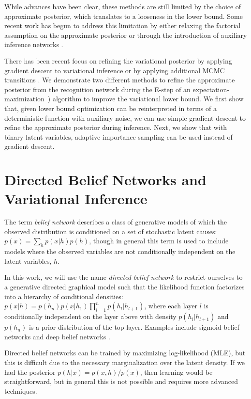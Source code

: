 \documentclass{article} %
\begin{document}
While advances have been clear, these methods are still limited by the choice
of approximate posterior, which translates to a looseness in the lower bound.
Some recent work has begun to address this limitation by either relaxing the
factorial assumption \citep{burda2015importance} on the approximate posterior or
through the introduction of auxiliary inference networks
\citep{rezende2015variational}.

There has been recent focus on
refining the variational posterior by applying gradient descent to variational
inference \citep{hoffman2013stochastic} or by applying additional MCMC
transitions \citep{salimans2014markov}. We demonstrate two different methods to
refine the approximate posterior from the recognition network during the E-step
of an expectation-maximization~\citep[EM,][]{dempster1977maximum, neal1998view})
algorithm to improve the variational lower bound. 
We first show that, given lower bound optimization can be
reinterpreted in terms of a deterministic function with auxiliary noise, we can use simple gradient descent
to refine the approximate posterior during inference. Next, we show that with
binary latent variables, adaptive importance sampling
\citep[AdIS][]{karamchandani1989adaptive} can be used instead of gradient descent.

\section{Directed Belief Networks and Variational Inference}

The term \emph{belief network} describes a class of generative models of which
the observed distribution is conditioned on a set of stochastic latent causes:
$p(x) = \sum_h p(x|h) p(h)$, though in general this term is used to include
models where the observed variables are not conditionally independent on the
latent variables, $h$. 

In this work, we will use the name \emph{directed belief network} to restrict
ourselves to a generative directed graphical model such that the likelihood
function factorizes into a hierarchy of conditional densities: $p(x | h) =
p(h_n) p(x|h_1) \prod_{l=1}^n p(h_{l}|h_{l+1})$, where each layer $l$ is
conditionally independent on the layer above with density $p(h_{l}|h_{l + 1})$
and $p(h_n)$ is a prior distribution of the top layer. Examples include sigmoid
belief networks \citep[SBN,][]{neal1992connectionist} and deep belief networks
\citep[DBN,][]{hinton2006fast}.

Directed belief networks can be trained by maximizing log-likelihood (MLE), but
this is difficult due to the necessary marginalization over the latent density.
If we had the posterior $p(h|x) = p(x, h) / p(x)$, then learning would be straightforward,
but in general this is not possible and requires more advanced
techniques. 
\end{document}
